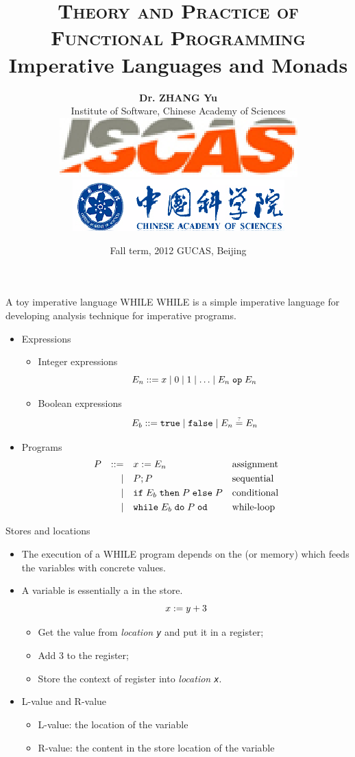 \documentclass[paper=screen,mode=present,style=zysimple]{powerdot}
\title{{\small \textsc{Theory and Practice of Functional Programming}}
\\[12pt]
{\Large \color{TitleColor} Imperative Languages and Monads}
}
\author{\small \textbf{Dr. ZHANG Yu}
  \\[2pt] \small Institute of Software, Chinese Academy of Sciences 
  \\[5pt] \includegraphics[height=.04\slideheight]{iscas.eps} 
  \qquad \qquad 
  \includegraphics[height=.04\slideheight]{cas.eps}
}
\date{\scriptsize Fall term, 2012 \qquad GUCAS, Beijing}
\begin{document}
\maketitle 

\begin{slide}{A toy imperative language WHILE}
WHILE is a simple imperative language for developing analysis technique for imperative programs.
\begin{itemize}
\item Expressions
\begin{itemize}
\item Integer expressions
\vspace*{-0.5em}
\[
E_n ::= x \mid 0 \mid 1 \mid \ldots \mid E_n \cop E_n 
\vspace*{-1.6em}
\]
\item Boolean expressions
\vspace*{-0.5em}
\[
E_b ::= \ctrue \mid \cfalse \mid E_n \eqtest E_n 
\vspace*{-0.6em}
\]
\end{itemize}
\item Programs 
\vspace*{-0.5em}
\[
\begin{array}{lrll}
P & ::= & x := E_n  & \mbox{assignment} 
\\[0.3em] & \mid & 
P; P & \mbox{sequential}
\\[0.3em] & \mid & 
\mathtt{if} \; {E_b} \; \mathtt{then} \; {P} \; \mathtt{else} \; {P} & \mbox{conditional} 
\\[0.3em] & \mid & 
\mathtt{while}\; {E_b} \; \mathtt{do} \; {P} \; \mathtt{od} & \mbox{while-loop}
\end{array}
\]
\end{itemize}
\end{slide}

\begin{slide}[method=direct]{Stores and locations}
\begin{itemize}
\item The execution of a WHILE program depends on the  (or memory) which feeds 
  the variables with concrete values. \\[0.3em]
\item A variable is essentially a  in the store.
\vspace*{-0.5em}
\[
x := y + 3
\vspace*{-0.6em}
\]
\begin{itemize}
\item Get the value from {\em location \verb|y|} and put it in a register;
\item Add 3 to the register;
\item Store the context of register into {\em location \verb|x|}.
\end{itemize}
\item L-value and R-value
\begin{itemize}
\item L-value: the location of the variable \\[0.2em]
\item R-value: the content in the store location of the variable
\end{itemize}
\end{itemize}
\end{slide}
\end{document}
